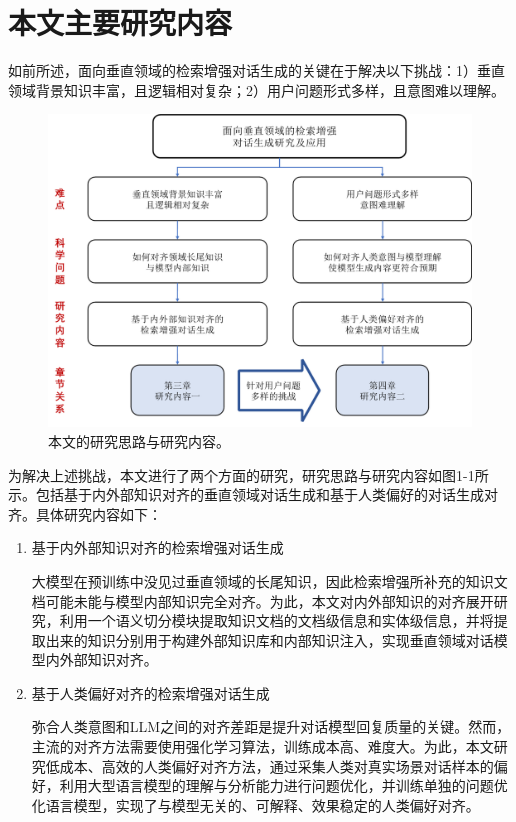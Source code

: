 \section{本文主要研究内容}

如前所述，面向垂直领域的检索增强对话生成的关键在于解决以下挑战：1）垂直领域背景知识丰富，且逻辑相对复杂；2）用户问题形式多样，且意图难以理解。

\begin{figure}[htbp]
	\centering
	\includegraphics[scale=0.55]{Fig/paper_structure.png}
	\caption{\label{research_idea_and_research_content_of_this_paper}本文的研究思路与研究内容。}
\end{figure}

为解决上述挑战，本文进行了两个方面的研究，研究思路与研究内容如图1-1所示。包括基于内外部知识对齐的垂直领域对话生成和基于人类偏好的对话生成对齐。具体研究内容如下：

\begin{enumerate}[topsep = 0 pt, itemsep= 0 pt, parsep=0pt, partopsep=0pt, leftmargin=0pt, itemindent=44pt, labelsep=6pt, listparindent=24pt, label=\arabic*)]
	\item 基于内外部知识对齐的检索增强对话生成
	
	大模型在预训练中没见过垂直领域的长尾知识，因此检索增强所补充的知识文档可能未能与模型内部知识完全对齐。为此，本文对内外部知识的对齐展开研究，利用一个语义切分模块提取知识文档的文档级信息和实体级信息，并将提取出来的知识分别用于构建外部知识库和内部知识注入，实现垂直领域对话模型内外部知识对齐。

	\item 基于人类偏好对齐的检索增强对话生成
	
	弥合人类意图和LLM之间的对齐差距是提升对话模型回复质量的关键。然而，主流的对齐方法需要使用强化学习算法，训练成本高、难度大。为此，本文研究低成本、高效的人类偏好对齐方法，通过采集人类对真实场景对话样本的偏好，利用大型语言模型的理解与分析能力进行问题优化，并训练单独的问题优化语言模型，实现了与模型无关的、可解释、效果稳定的人类偏好对齐。
\end{enumerate}

